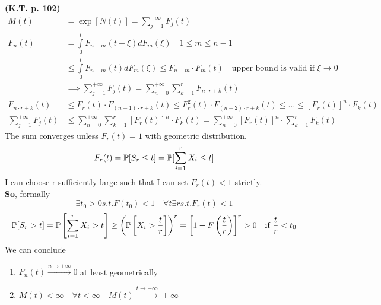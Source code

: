  \textbf{(K.T. p. 102)}
\begin{equation}
  \begin{split}
    M(t) &= \exp[N(t)] = \sum\limits_{j=1}^{+\infty}F_j(t) \\
    F_n(t) &= \int\limits_0^t F_{n-m}(t-\xi) dF_m(\xi) \quad 1 \le m \le n-1\\
    & \le \int\limits_0^t F_{n-m}(t) dF_m(\xi) \le F_{n-m} \cdot F_m(t) \quad \text{upper bound is valid if }\xi \to 0 \\
    &\implies  \sum\limits_{j=1}^{+\infty}F_j(t)= \sum\limits_{n=0}^{+\infty} \sum\limits_{k=1}^{r}F_{n \cdot r + k}(t) \\
    F_{n \cdot r + k} (t) &\le F_r(t) \cdot F_{(n-1)\cdot r + k}(t) \le F_r^2(t) \cdot F_{(n-2)\cdot r +k}(t) \le \dots
    \le \left[F_r(t)\right]^n \cdot F_k(t)\\
    \sum\limits_{j=1}^{+\infty}F_j(t) &\le \sum\limits_{n=0}^{+\infty} \sum\limits_{k=1}^{r}\left[F_r(t)\right]^n \cdot F_k(t)
    = \sum\limits_{n=0}^{+\infty} \left[F_r(t)\right]^n \cdot \sum\limits_{k=1}^{r}F_k(t)
  \end{split}
\end{equation}
The sum converges unless $F_r(t)=1$ with geometric distribution.
\begin{equation}
  F_r(t)=\mathbb{P}[S_r\le t]=\mathbb{P}[\sum\limits_{i=1}^r X_i \le t]
\end{equation}
I can choose r sufficiently large such that I can set $F_r(t)<1$ strictly. \\
\textbf{So}, formally
\begin{equation*}
  \exists t_0 >0 s.t. F(t_0)<1 \quad \forall t \exists r s.t. F_r(t)<1
\end{equation*}
\begin{equation*}
  \mathbb{P}[S_r >t] = \mathbb{P}\left[\sum\limits_{i=1}^r X_i > t \right] \ge
  \left(\mathbb{P}\left[X_i > \frac{t}{r}\right]\right)^r = \left[1-F\left(\frac{t}{r}\right)\right]^r>0
  \quad \text{if }\frac{t}{r}<t_0
\end{equation*}
We can conclude
\begin{enumerate}
  \item $F_n(t)\xrightarrow{n\to +\infty}0$ at least geometrically
  \item $M(t)<\infty \quad \forall t < \infty \quad M(t)\xrightarrow{t \to +\infty}+\infty$
\end{enumerate}
